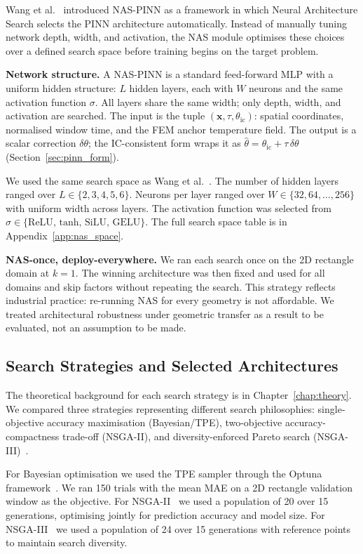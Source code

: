 Wang et al.~\cite{wang2023} introduced NAS-PINN as a framework in which
Neural Architecture Search selects the PINN architecture automatically.
Instead of manually tuning network depth, width, and activation, the NAS
module optimises these choices over a defined search space before training
begins on the target problem.

\textbf{Network structure.}
A NAS-PINN is a standard feed-forward MLP with a uniform hidden structure:
$L$ hidden layers, each with $W$ neurons and the same activation function $\sigma$.
All layers share the same width; only depth, width, and activation are searched.
The input is the tuple $(\mathbf{x}, \tau, \theta_\mathrm{ic})$: spatial
coordinates, normalised window time, and the FEM anchor temperature field.
The output is a scalar correction $\delta\theta$; the IC-consistent form wraps
it as $\hat\theta = \theta_\mathrm{ic} + \tau\,\delta\theta$ (Section~\ref{sec:pinn_form}).

We used the same search space as Wang et al.~\cite{wang2023}.
The number of hidden layers ranged over $L \in \{2,3,4,5,6\}$.
Neurons per layer ranged over $W \in \{32, 64, \ldots, 256\}$ with uniform
width across layers.
The activation function was selected from
$\sigma \in \{\text{ReLU},\, \text{tanh},\, \text{SiLU},\, \text{GELU}\}$.
The full search space table is in Appendix~\ref{app:nas_space}.

\textbf{NAS-once, deploy-everywhere.}
We ran each search once on the 2D rectangle domain at $k=1$.
The winning architecture was then fixed and used for all domains and skip
factors without repeating the search.
This strategy reflects industrial practice: re-running NAS for every geometry
is not affordable.
We treated architectural robustness under geometric transfer as a result to
be evaluated, not an assumption to be made.

\subsection{Search Strategies and Selected Architectures}

The theoretical background for each search strategy is in
Chapter~\ref{chap:theory}.
We compared three strategies representing different search philosophies:
single-objective accuracy maximisation (Bayesian/TPE), two-objective
accuracy-compactness trade-off (NSGA-II), and diversity-enforced Pareto
search (NSGA-III)~\cite{wang2023,wang2025nasv2}.

For Bayesian optimisation we used the TPE sampler through the Optuna
framework~\cite{akiba2019,bergstra2011}.
We ran 150 trials with the mean MAE on a 2D rectangle validation window as
the objective.
For NSGA-II~\cite{deb2002,blank2020pymoo} we used a population of 20 over
15 generations, optimising jointly for prediction accuracy and model size.
For NSGA-III~\cite{deb2014,blank2020pymoo} we used a population of 24 over
15 generations with reference points to maintain search diversity.

